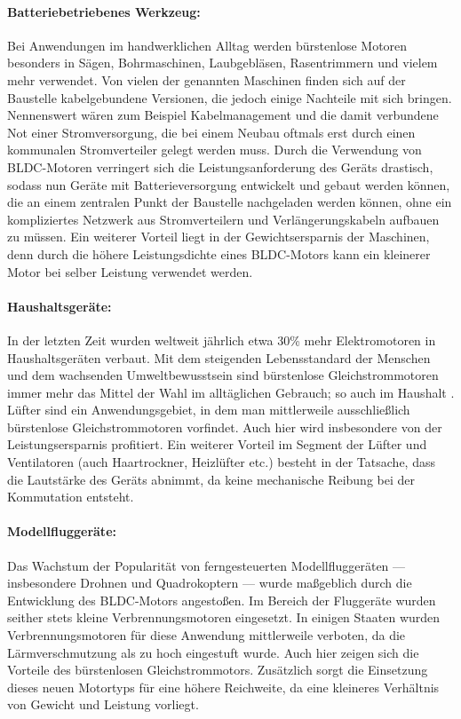 \paragraph{Batteriebetriebenes Werkzeug:} Bei Anwendungen im handwerklichen Alltag werden bürstenlose Motoren besonders in Sägen, Bohrmaschinen, Laubgebläsen, Rasentrimmern und vielem mehr verwendet. Von vielen der genannten Maschinen finden sich auf der Baustelle kabelgebundene Versionen, die jedoch einige Nachteile mit sich bringen. Nennenswert wären zum Beispiel Kabelmanagement und die damit verbundene Not einer Stromversorgung, die bei einem Neubau oftmals erst durch einen kommunalen Stromverteiler gelegt werden muss. Durch die Verwendung von BLDC-Motoren verringert sich die Leistungsanforderung des Geräts drastisch, sodass nun Geräte mit Batterieversorgung entwickelt und gebaut werden können, die an einem zentralen Punkt der Baustelle nachgeladen werden können, ohne ein kompliziertes Netzwerk aus Stromverteilern und Verlängerungskabeln aufbauen zu müssen. Ein weiterer Vorteil liegt in der Gewichtsersparnis der Maschinen, denn durch die höhere Leistungsdichte eines BLDC-Motors kann ein kleinerer Motor bei selber Leistung verwendet werden.

\paragraph{Haushaltsgeräte:} In der letzten Zeit wurden weltweit jährlich etwa 30\% mehr Elektromotoren in Haushaltsgeräten verbaut. Mit dem steigenden Lebensstandard der Menschen und dem wachsenden Umweltbewusstsein sind bürstenlose Gleichstrommotoren immer mehr das Mittel der Wahl im alltäglichen Gebrauch; so auch im Haushalt \parencite[vgl.][S.6]{Xia2012}. Lüfter sind ein Anwendungsgebiet, in dem man mittlerweile ausschließlich bürstenlose Gleichstrommotoren vorfindet. Auch hier wird insbesondere von der Leistungsersparnis profitiert. Ein weiterer Vorteil im Segment der Lüfter und Ventilatoren (auch Haartrockner, Heizlüfter etc.) besteht in der Tatsache, dass die Lautstärke des Geräts abnimmt, da keine mechanische Reibung bei der Kommutation entsteht.

\paragraph{Modellfluggeräte:} Das Wachstum der Popularität von ferngesteuerten Modellfluggeräten --- insbesondere Drohnen und Quadrokoptern --- wurde maßgeblich durch die Entwicklung des BLDC-Motors angestoßen. Im Bereich der Fluggeräte wurden seither stets kleine Verbrennungsmotoren eingesetzt. In einigen Staaten wurden Verbrennungsmotoren für diese Anwendung mittlerweile verboten, da die Lärmverschmutzung als zu hoch eingestuft wurde. Auch hier zeigen sich die Vorteile des bürstenlosen Gleichstrommotors. Zusätzlich sorgt die Einsetzung dieses neuen Motortyps für eine höhere Reichweite, da eine kleineres Verhältnis von Gewicht und Leistung vorliegt.

